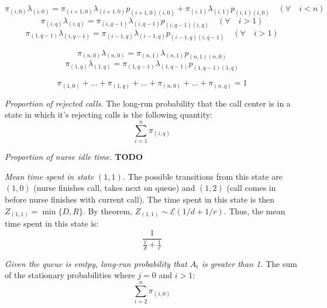 \documentclass[12pt]{article}
\begin{document}
$$ \pi_{(i,0)}\lambda_{(i,0)} = \pi_{(i+1,0)}\lambda_{(i+1,0)}p_{(i+1,0)(i,0)} + 
                                \pi_{(i,1)}\lambda_{(i,1)}p_{(i,1)(i,0)}
  \quad (\forall \quad i < n)$$
$$ \pi_{(i,q)}\lambda_{(i,q)} = \pi_{(i,q-1)}\lambda_{(i,q-1)}p_{(i,q-1)(i,q)}
  \quad (\forall \quad i > 1)$$
$$ \pi_{(1,q-1)}\lambda_{(i,q-1)} = \pi_{(i-1,q)}\lambda_{(i-1,q)}p_{(i-1,q)(i,q-1)} 
  \quad (\forall \quad i > 1)$$

$$ \pi_{(n,0)}\lambda_{(n,0)} = \pi_{(n,1)}\lambda_{(n,1)}p_{(n,1)(n,0)} $$ 
$$ \pi_{(1,q)}\lambda_{(1,q)} = \pi_{(1,q-1)}\lambda_{(1,q-1)}p_{(1,q-1)(1,q)} $$

$$ \pi_{(1,0)} + \dots + \pi_{(1,q)} + \dots + \pi_{(n,0)} + ... + \pi_{(n,q)} = 1 $$

\textit{Proportion of rejected calls.} The long-run probability that the call center
is in a state in which it's rejecting calls is the following quantity: 
$$ \sum_{i=1}^n{\pi_{(i,q)}}$$

\textit{Proportion of nurse idle time.} \textbf{TODO}

\textit{Mean time spent in state $(1,1)$.} The possible transitions from this state are 
$(1,0)$ (nurse finishes call, takes next on queue) and $(1,2)$ (call comes in 
before nurse finishes with current call). The time spent in this state is then 
$Z_{(1,1)} = \min \{ D, R \}$. By theorem, $Z_{(1,1)} \sim \mathcal{E}(1/d + 1/r)$. Thus,
the mean time spent in this state is: $$ \frac{1}{\frac{1}{d} + \frac{1}{r}} $$ 

\textit{Given the queue is emtpy, long-run probability that $A_t$ is greater than 1.} 
The sum of the stationary probabilities where $j=0$ and $i>1$: 
$$ \sum_{i=2}^n{\pi_{(i,0)}} $$
\end{document}
